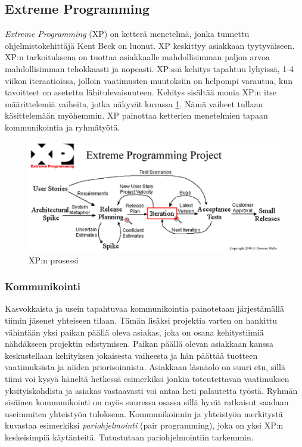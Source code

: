\documentclass[finnish]{../tktltiki2}
\theoremstyle{definition}
\theoremstyle{remark}
\begin{document}
\subsection{Extreme Programming}

\emph{Extreme Programming} (XP) on ketterä menetelmä, jonka tunnettu 
ohjelmistokehittäjä Kent Beck on luonut. XP keskittyy asiakkaan tyytyväiseen. XP:n tarkoituksena on tuottaa 
asiakkaalle mahdollisimman paljon arvoa mahdollisimman tehokkaasti ja nopeasti.
XP:ssä kehitys tapahtuu lyhyissä, 1-4 viikon iteraatioissa, jolloin vaatimusten 
muutoksiin on helpompi varautua, kun tavoitteet on asetettu 
lähitulevaisuuteen. Kehitys sisältää monia XP:n itse määrittelemiä vaiheita, jotka
näkyvät kuvassa \ref{xprocess}. Nämä vaiheet tullaan käsittelemään myöhemmin.
XP painottaa ketterien menetelmien tapaan kommunikointia ja ryhmätyötä.

\begin{figure}[ht]
     \includegraphics[width=12cm]{xp.png}
     \caption{XP:n prosessi~\cite{XP.ORGMAP}}\label{xprocess}
\end{figure}

\subsubsection{Kommunikointi}

Kasvokkaista ja usein tapahtuvaa kommunikointia painotetaan järjestämällä tiimin jäsenet yhteiseen tilaan. Tämän lisäksi projektia varten on hankittu vähintään yksi paikan päällä oleva asiakas, joka on osana kehitystiimiä nähdäkseen projektin edistymisen. Paikan päällä olevan asiakkaan kanssa keskustellaan kehityksen jokaisesta vaiheesta ja hän päättää tuotteen vaatimuksista ja niiden priorisoinnista. Asiakkaan läsnäolo on suuri etu, sillä tiimi voi kysyä häneltä hetkessä esimerkiksi jonkin toteutettavan vaatimuksen yksityiskohdista ja asiakas vastaavasti voi antaa heti palautetta työstä. Ryhmän sisäinen kommunikointi on myös suuressa osassa sillä hyvät ratkaisut saadaan useimmiten yhteistyön tuloksena. Kommunikoinnin ja yhteistyön merkitystä kuvastaa esimerkiksi \emph{pariohjelmointi} (pair 
programming), joka on yksi XP:n keskeisimpiä käytänteitä.
Tutustutaan pariohjelmointiin tarkemmin.
\end{document}
